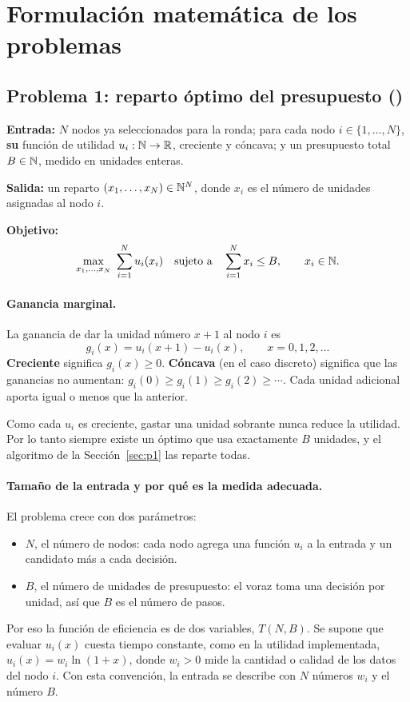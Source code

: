 \section{Formulación matemática de los problemas}

\subsection{Problema 1: reparto óptimo del presupuesto (\REP)}

\begin{definicion}\label{def:rep}
\textbf{Entrada:} $N$ nodos ya seleccionados para la ronda; para cada nodo $i\in\{1,\dots,N\}$, \textbf{su} función de utilidad $u_i:\mathbb{N}\to\mathbb{R}$, creciente y cóncava; y un presupuesto total $B\in\mathbb{N}$, medido en unidades enteras.

\textbf{Salida:} un reparto $(x_1,\dots,x_N)\in\mathbb{N}^N$, donde $x_i$ es el número de unidades asignadas al nodo $i$.

\textbf{Objetivo:}
\[
\max_{x_1,\dots,x_N}\ \sum_{i=1}^{N} u_i(x_i)
\quad\text{sujeto a}\quad \sum_{i=1}^{N} x_i \le B,\qquad x_i\in\mathbb{N} .
\]
\end{definicion}

\paragraph{Ganancia marginal.} La ganancia de dar la unidad número $x+1$ al nodo $i$ es
\[
g_i(x) = u_i(x+1) - u_i(x), \qquad x = 0,1,2,\dots
\]
\textbf{Creciente} significa $g_i(x)\ge 0$. \textbf{Cóncava} (en el caso discreto) significa que las ganancias no aumentan: $g_i(0) \ge g_i(1) \ge g_i(2) \ge \cdots$. Cada unidad adicional aporta igual o menos que la anterior.

\begin{observacion}[$\le B$ o $=B$]
Como cada $u_i$ es creciente, gastar una unidad sobrante nunca reduce la utilidad. Por lo tanto siempre existe un óptimo que usa exactamente $B$ unidades, y el algoritmo de la Sección~\ref{sec:p1} las reparte todas.
\end{observacion}

\paragraph{Tamaño de la entrada y por qué es la medida adecuada.} El problema crece con dos parámetros:
\begin{itemize}
  \item $N$, el número de nodos: cada nodo agrega una función $u_i$ a la entrada y un candidato más a cada decisión.
  \item $B$, el número de unidades de presupuesto: el voraz toma una decisión por unidad, así que $B$ es el número de pasos.
\end{itemize}
Por eso la función de eficiencia es de dos variables, $T(N,B)$. Se supone que evaluar $u_i(x)$ cuesta tiempo constante, como en la utilidad implementada, $u_i(x)=w_i\ln(1+x)$, donde $w_i>0$ mide la cantidad o calidad de los datos del nodo $i$. Con esta convención, la entrada se describe con $N$ números $w_i$ y el número $B$.

